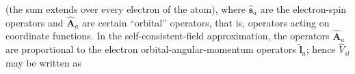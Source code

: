 (the sum extends over every electron of the atom), where $\hat{\mathbf s}_a$ are the electron-spin operators and $\hat{\mathbf A}_a$ are certain ``orbital'' operators, that is, operators acting on coordinate functions. In the self-consistent-field approximation, the operators $\hat{\mathbf A}_a$ are proportional to the electron orbital-angular-momentum operators $\hat{\mathbf l}_a$; hence $\hat V_{sl}$ may be written as
